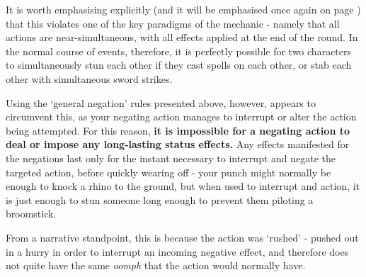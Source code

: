 It is worth emphasising explicitly (and it will be emphasised once again on page \pageref{S:CycleLimitations}) that this violates one of the key paradigms of the  mechanic - namely that all actions are near-simultaneous, with all effects applied at the end of the round. In the normal course of events, therefore, it is perfectly possible for two characters to simultaneously stun each other if they cast spells on each other, or stab each other with simultaneous sword strikes.

Using the `general negation' rules presented above, however, appears to circumvent this, as your negating action manages to interrupt or alter the action being attempted. For this reason, {\bf it is impossible for a negating action to deal  or impose any long-lasting status effects.} Any effects manifested for the negations last only for the instant necessary to interrupt and negate the targeted action, before quickly wearing off - your punch might normally be enough to knock a rhino to the ground, but when used to interrupt and action, it is just enough to stun someone long enough to prevent them piloting a broomstick.

 From a narrative standpoint, this is because the action was `rushed' - pushed out in a hurry in order to interrupt an incoming negative effect, and therefore does not quite have the same {\it oomph} that the action would normally have. 
